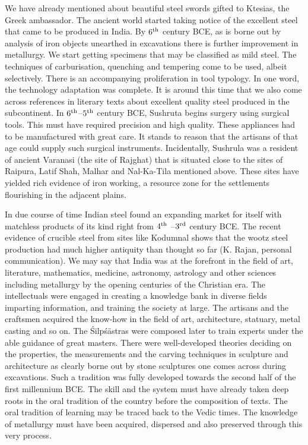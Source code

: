 We have already mentioned about beautiful steel swords gifted to Ktesias, the Greek ambassador. The ancient world started taking notice of the excellent steel that came to be produced in India. By $6^{\rm th}$ century BCE, as is borne out by analysis of iron objects unearthed in excavations there is further improvement in metallurgy. We start getting specimens that may be classified as mild steel. The techniques of carburisation, quenching and tempering come to be used, albeit selectively. There is an accompanying proliferation in tool typology. In one word, the technology adaptation was complete. It is around this time that we also come across references in literary texts about excellent quality steel produced in the subcontinent. In $6^{\rm th}$–$5^{\rm th}$ century BCE, Sushruta begins surgery using surgical tools. This must have required precision and high quality. These appliances had to be manufactured with great care. It stands to reason that the artisans of that age could supply such surgical instruments. Incidentally, Sushrula was a resident of ancient Varanasi (the site of Rajghat) that is situated close to the sites of Raipura, Latif Shah, Malhar and Nal-Ka-Tila mentioned above. These sites have yielded rich evidence of iron working, a resource zone for the settlements flourishing in the adjacent plains.   	

In due course of time Indian steel found an expanding market for itself with matchless products of its kind right from $4^{\rm th}$ –$3^{\rm rd}$ century BCE. The recent evidence of crucible steel from sites like Kodumnal shows that the wootz steel production had much higher antiquity than thought so far (K. Rajan, personal communication). We may say that India was at the forefront in the field of art, literature, mathematics, medicine, astronomy, astrology and other sciences including metallurgy by the opening centuries of the Christian era. The intellectuals were engaged in creating a knowledge bank in diverse fields imparting information, and training the society at large. The artisans and the craftsmen acquired the know-how in the field of art, architecture, statuary, metal casting and so on. The Śilpśāstras were composed later to train experts under the able guidance of great masters. There were well-developed theories deciding on the properties, the measurements and the carving techniques in sculpture and architecture as clearly borne out by stone sculptures one comes across during excavations. Such a tradition was fully developed towards the second half of the first millennium BCE. The skill and the system must have already taken deep roots in the oral tradition of the country before the composition of texts. The oral tradition of learning may be traced back to the Vedic times. The knowledge of metallurgy must have been acquired, dispersed and also preserved through this very process. 


